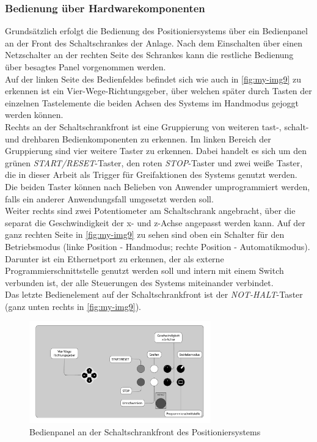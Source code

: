 \documentclass[../../../Bachelorarbeit.tex]{subfiles}
\begin{document}
\subsubsection{Bedienung über Hardwarekomponenten}
Grundsätzlich erfolgt die Bedienung des Positioniersystems über ein Bedienpanel an der Front des Schaltschrankes der Anlage. Nach dem Einschalten über einen Netzschalter an der rechten Seite des Schrankes kann die restliche Bedienung über besagtes Panel vorgenommen werden.\\
Auf der linken Seite des Bedienfeldes befindet sich wie auch in \autoref{fig:my-img9} zu erkennen ist ein Vier-Wege-Richtungsgeber, über welchen später durch Tasten der einzelnen Tastelemente die beiden Achsen des Systems im Handmodus gejoggt werden können.\\
Rechts an der Schaltschrankfront ist eine Gruppierung von weiteren tast-, schalt- und drehbaren Bedienkomponenten zu erkennen. Im linken Bereich der Gruppierung sind vier weitere Taster zu erkennen. Dabei handelt es sich um den grünen \textit{START/RESET}-Taster, den roten \textit{STOP}-Taster und zwei weiße Taster, die in dieser Arbeit als Trigger für Greifaktionen des Systems genutzt werden. Die beiden Taster können nach Belieben von Anwender umprogrammiert werden, falls ein anderer Anwendungsfall umgesetzt werden soll.\\
Weiter rechts sind zwei Potentiometer am Schaltschrank angebracht, über die separat die Geschwindigkeit der x- und z-Achse angepasst werden kann. Auf der ganz rechten Seite in \autoref{fig:my-img9} zu sehen sind oben ein Schalter für den Betriebsmodus (linke Position - Handmodus; rechte Position - Automatikmodus). Darunter ist ein Ethernetport zu erkennen, der als externe Programmierschnittstelle genutzt werden soll und intern mit einem Switch verbunden ist, der alle Steuerungen des Systems miteinander verbindet.\\
Das letzte Bedienelement auf der Schaltschrankfront ist der \textit{NOT-HALT}-Taster (ganz unten rechts in \autoref{fig:my-img9}).

\begin{figure}[H]
    \centering
    \includegraphics[width=0.7\textwidth]{Images/SchaltschrankFront.pdf}
    \caption[Bedienpanel]{Bedienpanel an der Schaltschrankfront des Positioniersystems}
    \label{fig:my-img9}
\end{figure}
\end{document}
